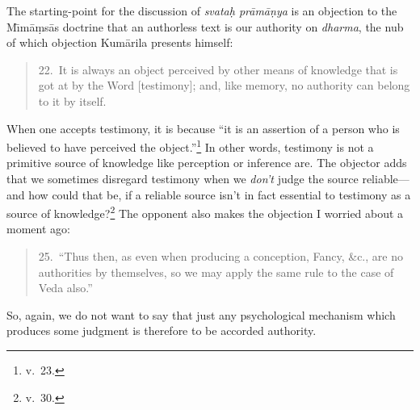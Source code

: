 \documentclass[11pt,letterpaper,oneside]{amsart}
\newenvironment{squote}{\begin{quote}\sf\small}{\rm\end{quote}} %
\begin{document}
The starting-point for the discussion of \emph{svata\d h pr\=am\=a\d nya} is an objection to the M\={\i}m\=a\d ms\=as doctrine that an authorless text is our authority on \emph{dharma}, the nub of which objection Kum\=arila presents himself:\begin{squote}22.\ It is always an object perceived by other means of knowledge that is got at by the Word [testimony]; and, like memory, no authority can belong to it by itself.\end{squote} When one accepts testimony, it is because ``it is an assertion of a person who is believed to have perceived the object.''\footnote{v.\ 23.} In other words, testimony is not a primitive source of knowledge like perception or inference are. The objector adds that we sometimes disregard testimony when we \emph{don't} judge the source reliable---and how could that be, if a reliable source isn't in fact essential to testimony as a source of knowledge?\footnote{v.\ 30.} The opponent also makes the objection I worried about a moment ago:\begin{squote}25.\ ``Thus then, as even when producing a conception, Fancy, \&c., are no authorities by themselves, so we may apply the same rule to the case of Veda also.''\end{squote} So, again, we do not want to say that just any psychological mechanism which produces some judgment is therefore to be accorded authority.
\end{document}
